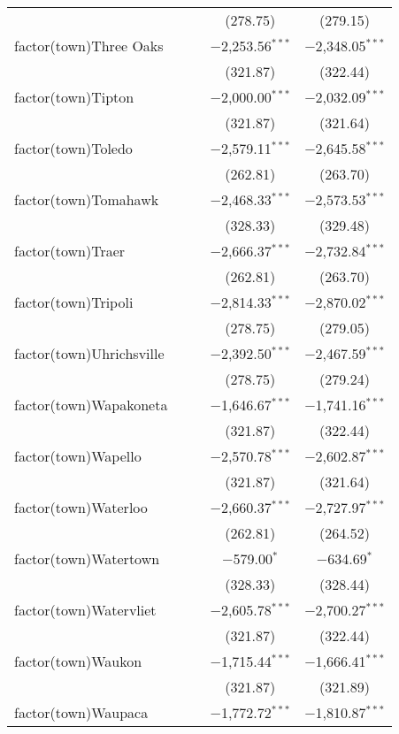 \begin{table}[!htbp]
\begin{tabular}{@{\extracolsep{5pt}}lcccc}
  &  &  & (278.75) & (279.15) \\ 
  factor(town)Three Oaks &  &  & $-$2,253.56$^{***}$ & $-$2,348.05$^{***}$ \\ 
  &  &  & (321.87) & (322.44) \\ 
  factor(town)Tipton &  &  & $-$2,000.00$^{***}$ & $-$2,032.09$^{***}$ \\ 
  &  &  & (321.87) & (321.64) \\ 
  factor(town)Toledo &  &  & $-$2,579.11$^{***}$ & $-$2,645.58$^{***}$ \\ 
  &  &  & (262.81) & (263.70) \\ 
  factor(town)Tomahawk &  &  & $-$2,468.33$^{***}$ & $-$2,573.53$^{***}$ \\ 
  &  &  & (328.33) & (329.48) \\ 
  factor(town)Traer &  &  & $-$2,666.37$^{***}$ & $-$2,732.84$^{***}$ \\ 
  &  &  & (262.81) & (263.70) \\ 
  factor(town)Tripoli &  &  & $-$2,814.33$^{***}$ & $-$2,870.02$^{***}$ \\ 
  &  &  & (278.75) & (279.05) \\ 
  factor(town)Uhrichsville &  &  & $-$2,392.50$^{***}$ & $-$2,467.59$^{***}$ \\ 
  &  &  & (278.75) & (279.24) \\ 
  factor(town)Wapakoneta &  &  & $-$1,646.67$^{***}$ & $-$1,741.16$^{***}$ \\ 
  &  &  & (321.87) & (322.44) \\ 
  factor(town)Wapello &  &  & $-$2,570.78$^{***}$ & $-$2,602.87$^{***}$ \\ 
  &  &  & (321.87) & (321.64) \\ 
  factor(town)Waterloo &  &  & $-$2,660.37$^{***}$ & $-$2,727.97$^{***}$ \\ 
  &  &  & (262.81) & (264.52) \\ 
  factor(town)Watertown &  &  & $-$579.00$^{*}$ & $-$634.69$^{*}$ \\ 
  &  &  & (328.33) & (328.44) \\ 
  factor(town)Watervliet &  &  & $-$2,605.78$^{***}$ & $-$2,700.27$^{***}$ \\ 
  &  &  & (321.87) & (322.44) \\ 
  factor(town)Waukon &  &  & $-$1,715.44$^{***}$ & $-$1,666.41$^{***}$ \\ 
  &  &  & (321.87) & (321.89) \\ 
  factor(town)Waupaca &  &  & $-$1,772.72$^{***}$ & $-$1,810.87$^{***}$ \\ 

\end{tabular}
\end{table}
